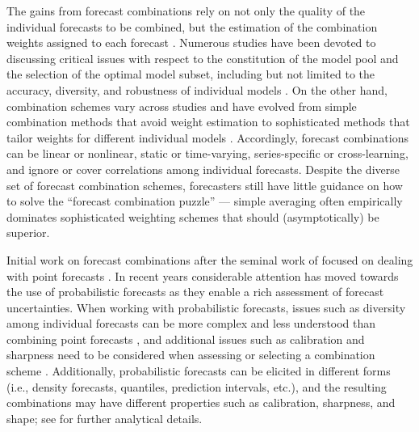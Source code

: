 \documentclass[11pt]{article}
\begin{document}
The gains from forecast combinations rely on not only the quality of the individual forecasts to be combined, but the estimation of the combination weights assigned to each forecast \citep{Timmermann2006-en,Cang2014-tp}. Numerous studies have been devoted to discussing critical issues with respect to the constitution of the model pool and the selection of the optimal model subset, including but not limited to the accuracy, diversity, and robustness of individual models \citep{Batchelor1995-ps,Mannes2014-dl,Thomson2019-al,Lichtendahl2020-ut,Kang2021-ol}. On the other hand, combination schemes vary across studies and have evolved from simple combination methods that avoid weight estimation \citep[e.g.,][]{Clemen1986-pd,Palm1992-im,Genre2013-ut,Grushka-Cockayne2017-dj,Petropoulos2020-fp} to sophisticated methods that tailor weights for different individual models \citep[e.g.,][]{Bates1969-yj,Newbold1974-lp,Kolassa2011-ai,Li2020-od,Montero-Manso2020-tq,Kang2021-ol,Wang2021-un}. Accordingly, forecast combinations can be linear or nonlinear, static or time-varying, series-specific or cross-learning, and ignore or cover correlations among individual forecasts. Despite the diverse set of forecast combination schemes, forecasters still have little guidance on how to solve the ``forecast combination puzzle'' \citep{Stock2004-rq,Smith2009-wd,Claeskens2016-pv,Chan2018-jl} --- simple averaging often empirically dominates sophisticated weighting schemes that should (asymptotically) be superior.

Initial work on forecast combinations after the seminal work of \citet{Bates1969-yj} focused on dealing with point forecasts \citep[see, for example,][]{Clemen1989-fb,Timmermann2006-en}. In recent years considerable attention has moved towards the use of probabilistic forecasts \citep[e.g.,][]{Hall2007-lh,Gneiting2013-hl,Kapetanios2015-bb,Martin2021-yi} as they enable a rich assessment of forecast uncertainties. When working with probabilistic forecasts, issues such as diversity among individual forecasts can be more complex and less understood than combining point forecasts \citep{Ranjan2010-jl}, and additional issues such as calibration and sharpness need to be considered when assessing or selecting a combination scheme \citep{Gneiting2007-fr}. Additionally, probabilistic forecasts can be elicited in different forms (i.e., density forecasts, quantiles, prediction intervals, etc.), and the resulting combinations may have different properties such as calibration, sharpness, and shape; see \citet{Lichtendahl2013-rt} for further analytical details.
\end{document}
